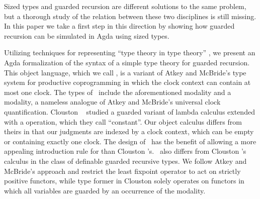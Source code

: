 



Sized types and guarded recursion are different solutions to the same
problem, but a thorough study of the relation between these two
disciplines is still missing. In this paper we take a first step in
this direction by showing how guarded recursion can be simulated in
Agda using sized types. 

Utilizing techniques for representing ``type theory in type theory''
\cite{AltenkirchK16,Chapman09}, we present an Agda formalization of
the syntax of a simple type theory for guarded recursion. This object
language, which we call \GTT, is a variant of Atkey and McBride's type
system for productive coprogramming \cite{atkey2013productive} in
which the clock context can contain at most one clock. The types of
\GTT\ include the aforementioned  modality and a  modality,
a nameless analogue of Atkey and McBride's universal clock
quantification. Clouston \etal \ \cite{CloustonBGB15} studied a
guarded variant of lambda calculus extended with a  operation,
which they call ``constant''.  Our object calculus differs from
theirs in that our judgments are indexed by a clock context, which can
be empty or containing exactly one clock. 
The design of \GTT\ has the benefit of allowing a more appealing introduction rule for
 than Clouston \etal 's.
\GTT\ also differs from Clouston \etal 's calculus in the class of definable
guarded recursive types. We follow Atkey and McBride's approach and
restrict the least fixpoint operator  to act on strictly positive
functors, while  type former in Clouston \etal solely operates on functors
in which all variables are guarded by an occurrence of the  modality.

